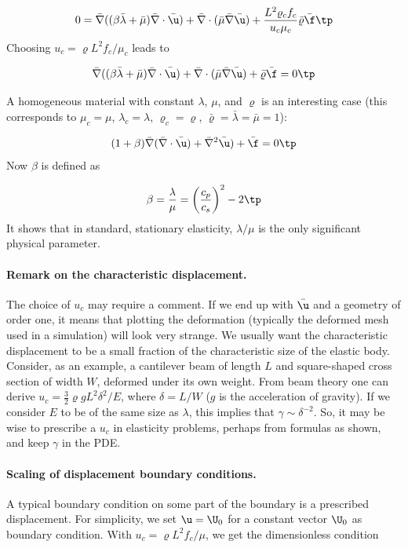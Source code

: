 \documentclass[graybox,envcountchap,sectrefs,final]{svmonodo}
\begin{document}
\[
0 =
\bar \nabla ((\beta\bar\lambda +
\bar\mu)\bar \nabla\cdot\bar \u) +
\bar \nabla\cdot(\bar \mu\bar \nabla\bar \u) +
\frac{L^2\varrho_cf_c}{u_c\mu_c}\bar\varrho\bar\f\tp
\]
Choosing $u_c = \varrho L^2f_c/\mu_c$ leads to

\begin{equation}
\bar \nabla ((\beta\bar\lambda +
\bar\mu)\bar \nabla\cdot\bar \u) +
\bar \nabla\cdot(\bar \mu\bar \nabla\bar \u) +
\bar\varrho\bar\f = 0\tp
\end{equation}

A homogeneous material with constant $\lambda$, $\mu$, and $\varrho$
is an interesting case (this corresponds to $\mu_c=\mu$, $\lambda_c=\lambda$,
$\varrho_c=\varrho$, $\bar\varrho=\bar\lambda=\bar\mu=1$):

\begin{equation}
(1+\beta)\bar \nabla(\bar \nabla\cdot\bar \u) +
\bar \nabla^2\bar \u) +
\bar\f = 0\tp
\end{equation}
Now $\beta$ is defined as

\[ \beta = \frac{\lambda}{\mu} = \left(\frac{c_p}{c_s}\right)^2 - 2\tp\]
It shows that in standard, stationary elasticity, $\lambda/\mu$ is the
only significant physical parameter.

\paragraph{Remark on the characteristic displacement.}
The choice of $u_c$ may require a comment. If we end up with
$\bar\u$ and a geometry of order one, it means that plotting the
deformation (typically the deformed mesh used in a simulation) will
look very strange.  We usually want the characteristic displacement to
be a small fraction of the characteristic size of the elastic
body. Consider, as an example, a cantilever beam of length $L$ and
square-shaped cross section of width $W$, deformed under its own
weight.  From beam theory one can derive $u_c = \frac{3}{2}\varrho g
L^2\delta^2/E$, where $\delta = L/W$ ($g$ is the acceleration of
gravity). If we consider $E$ to be of the
same size as $\lambda$, this implies that $\gamma\sim\delta^{-2}$. So,
it may be wise to prescribe a $u_c$ in elasticity problems, perhaps
from formulas as shown, and keep $\gamma$ in the PDE.

\paragraph{Scaling of displacement boundary conditions.}
A typical boundary condition on some part of the boundary is a prescribed
displacement. For simplicity, we set $\u = \U_0$ for a constant vector
$\U_0$ as boundary condition. With $u_c=\varrho L^2f_c/\mu$, we get
the dimensionless condition
\end{document}

